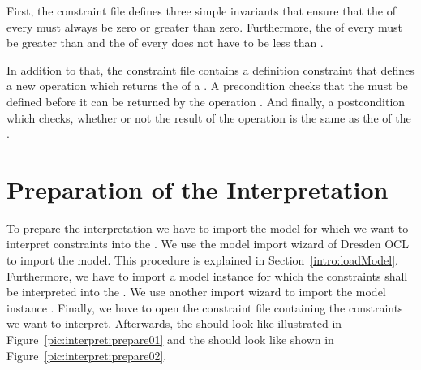 First, the constraint file defines three simple invariants that ensure that 
the  of every  must always be zero or greater than
zero.
Furthermore, the  of every  must be greater than
 and the  of every  does not have to be
less than .

In addition to that, the constraint file contains a definition constraint that 
defines a new operation  which returns the  of a 
. A precondition checks that the  must be defined 
before it can be returned by the operation . And finally, a 
postcondition which checks, whether or not the result of the operation 
 is the same as the  of the .



\section{Preparation of the Interpretation}

To prepare the interpretation we have to import the model 
 for which we want to interpret constraints into the
. We use the model import wizard of Dresden OCL to import
the model. This procedure is explained in Section~\ref{intro:loadModel}. 
Furthermore, we have to import a model instance for which the constraints shall 
be interpreted into the . We use another import 
wizard to import the model instance 
.
Finally, we have to open the constraint file 
containing the constraints we want to interpret. Afterwards, the  should look like illustrated in Figure~\ref{pic:interpret:prepare01} 
and the  should look like shown in 
Figure~\ref{pic:interpret:prepare02}.

